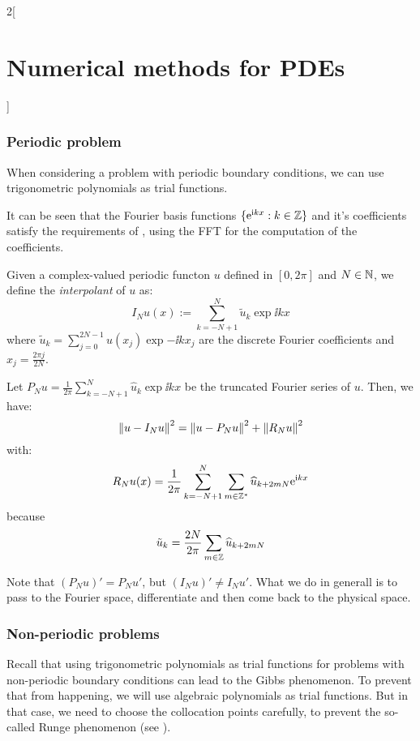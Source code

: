 \documentclass[../../../main_math.tex]{subfiles}
\begin{document}
\begin{multicols}{2}[\section{Numerical methods for PDEs}]
  \subsubsection{Periodic problem}
  When considering a problem with periodic boundary conditions, we can use trigonometric polynomials as trial functions.
  \begin{remark}
    It can be seen that the Fourier basis functions $\{ \mathrm{e}^{\mathrm{i} k x}:k\in\mathbb{Z}\}$ and it's coefficients satisfy the requirements of , using the FFT for the computation of the coefficients.
  \end{remark}
  \begin{definition}
    Given a complex-valued periodic functon $u$ defined in $[0,2\pi]$ and $N\in\mathbb{N}$, we define the \emph{interpolant} of $u$ as:
    $$
      I_Nu(x):=\sum_{k=-N+1}^N \tilde{u}_k\exp{\ii k x}
    $$
    where $\tilde{u}_k=\sum_{j=0}^{2N-1}u(x_j)\exp{-\ii k x_j}$ are the discrete Fourier coefficients and $x_j=\frac{2\pi j}{2N}$.
  \end{definition}
  \begin{proposition}
    Let $P_Nu=\frac{1}{2\pi}\sum_{k=-N+1}^N \widehat{u}_k\exp{\ii k x}$ be the truncated Fourier series of $u$. Then, we have:
    $$
      \left\|u-I_Nu\right\|^2=\left\|u-P_Nu\right\|^2+\left\|R_Nu\right\|^2
    $$
    with:
    $$
      R_Nu(x)= \frac{1}{2\pi}\sum_{k=-N+1}^N \sum_{m\in\mathbb{Z}^*} \widehat{u}_{k+2mN}\mathrm{e}^{\mathrm{i} k x}
    $$
    because $$
      \tilde{u}_k=\frac{2N}{2\pi}\sum_{m\in\mathbb{Z}} \widehat{u}_{k+2mN}
    $$
  \end{proposition}
  \begin{remark}
    Note that ${(P_Nu)}'=P_Nu'$, but ${(I_Nu)}'\neq I_Nu'$. What we do in generall is to pass to the Fourier space, differentiate and then come back to the physical space.
  \end{remark}
  \subsubsection{Non-periodic problems}
  \begin{remark}
    Recall that using trigonometric polynomials as trial functions for problems with non-periodic boundary conditions can lead to the Gibbs phenomenon. To prevent that from happening, we will use algebraic polynomials as trial functions. But in that case, we need to choose the collocation points carefully, to prevent the so-called Runge phenomenon (see ).


\end{remark}
\end{multicols}
\end{document}
